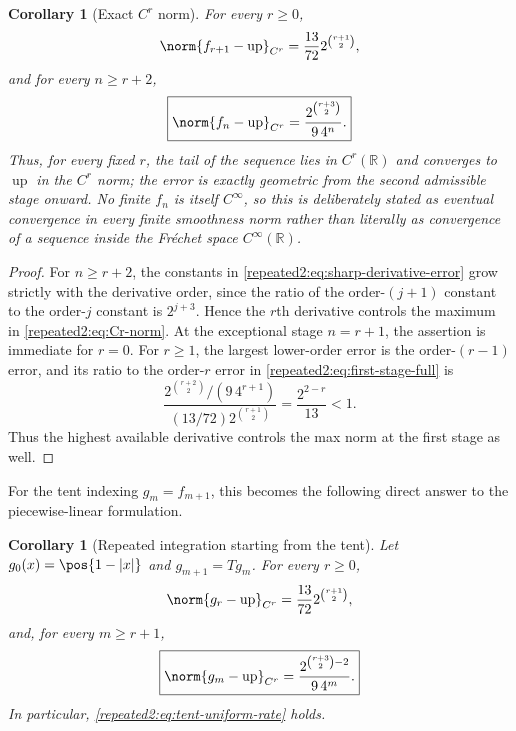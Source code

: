 \documentclass[11pt,oneside]{article}
\newtheorem{corollary}[theorem]{Corollary}
\theoremstyle{definition}
\theoremstyle{remark}
\newcommand{\R}{\mathbb R}
\newcommand{\Up}{\operatorname{up}}
\begin{document}
\begin{corollary}[Exact $C^r$ norm]
\label{repeated2:cor:exact-Cr-rate}
For every $r\ge0$,
\begin{equation}
 \norm{f_{r+1}-\Up}_{C^r}
 =\frac{13}{72}2^{\binom{r+1}{2}},
 \label{repeated2:eq:first-Cr-error}
\end{equation}
and for every $n\ge r+2$,
\begin{equation}
 \boxed{\displaystyle
 \norm{f_n-\Up}_{C^r}
 =\frac{2^{\binom{r+3}{2}}}{9\,4^n}.}
 \label{repeated2:eq:exact-Cr-rate}
\end{equation}
Thus, for every fixed $r$, the tail of the sequence lies in $C^r(\R)$ and converges to
$\Up$ in the $C^r$ norm; the error is exactly geometric from the second admissible stage
onward.  No finite $f_n$ is itself $C^\infty$, so this is deliberately stated as eventual
convergence in every finite smoothness norm rather than literally as convergence of a
sequence inside the Fr\'echet space $C^\infty(\R)$.
\end{corollary}

\begin{proof}
For $n\ge r+2$, the constants in \eqref{repeated2:eq:sharp-derivative-error} grow strictly with the
derivative order, since the ratio of the order-$(j+1)$ constant to the order-$j$ constant
is $2^{j+3}$.  Hence the $r$th derivative controls the maximum in
\eqref{repeated2:eq:Cr-norm}.  At the exceptional stage $n=r+1$, the assertion is immediate for
$r=0$.  For $r\ge1$, the largest lower-order error is the order-$(r-1)$ error, and its
ratio to the order-$r$ error in \eqref{repeated2:eq:first-stage-full} is
\[
 \frac{2^{\binom{r+2}{2}}/(9\,4^{r+1})}
 {(13/72)2^{\binom{r+1}{2}}}
 =\frac{2^{2-r}}{13}<1.
\]
Thus the highest available derivative controls the max norm at the first stage as well.
\end{proof}

For the tent indexing $g_m=f_{m+1}$, this becomes the following direct answer to the
piecewise-linear formulation.

\begin{corollary}[Repeated integration starting from the tent]
\label{repeated2:cor:tent-indexed-rate}
Let $g_0(x)=\pos{1-|x|}$ and $g_{m+1}=Tg_m$.  For every $r\ge0$,
\begin{equation}
 \norm{g_r-\Up}_{C^r}
 =\frac{13}{72}2^{\binom{r+1}{2}},
 \label{repeated2:eq:tent-first-Cr}
\end{equation}
and, for every $m\ge r+1$,
\begin{equation}
 \boxed{\displaystyle
 \norm{g_m-\Up}_{C^r}
 =\frac{2^{\binom{r+3}{2}-2}}{9\,4^m}.}
 \label{repeated2:eq:tent-Cr-rate}
\end{equation}
In particular, \eqref{repeated2:eq:tent-uniform-rate} holds.
\end{corollary}
\end{document}

